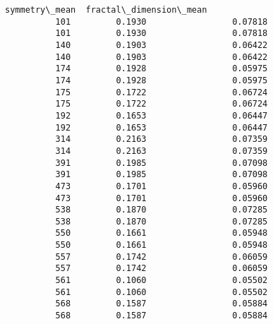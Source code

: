 \documentclass[11pt]{article}
\begin{document}
\begin{Verbatim}[commandchars=\\\{\}]
               symmetry\_mean  fractal\_dimension\_mean  
          101         0.1930                 0.07818  
          101         0.1930                 0.07818  
          140         0.1903                 0.06422  
          140         0.1903                 0.06422  
          174         0.1928                 0.05975  
          174         0.1928                 0.05975  
          175         0.1722                 0.06724  
          175         0.1722                 0.06724  
          192         0.1653                 0.06447  
          192         0.1653                 0.06447  
          314         0.2163                 0.07359  
          314         0.2163                 0.07359  
          391         0.1985                 0.07098  
          391         0.1985                 0.07098  
          473         0.1701                 0.05960  
          473         0.1701                 0.05960  
          538         0.1870                 0.07285  
          538         0.1870                 0.07285  
          550         0.1661                 0.05948  
          550         0.1661                 0.05948  
          557         0.1742                 0.06059  
          557         0.1742                 0.06059  
          561         0.1060                 0.05502  
          561         0.1060                 0.05502  
          568         0.1587                 0.05884  
          568         0.1587                 0.05884  
\end{Verbatim}
            
\end{document}
